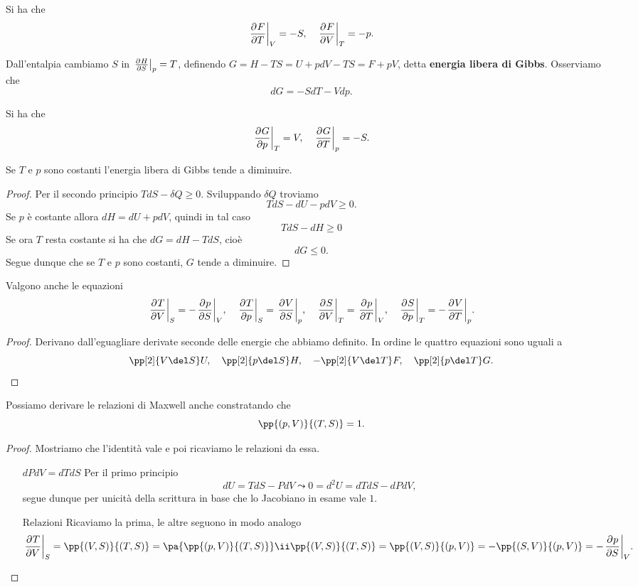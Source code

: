 \begin{remark}
Si ha che
\[\ppb TFV=-S,\quad \ppb VFT=-p.\]
\end{remark}

\begin{definition}
Dall'entalpia cambiamo $S$ in $\ppb SHp=T$, definendo $G=H-TS=U+pdV-TS=F+pV$, detta \textbf{energia libera di Gibbs}. Osserviamo che
\[dG=-SdT-Vdp.\]
\end{definition}

\begin{remark}
Si ha che
\[\ppb pGT=V,\quad \ppb TGp=-S.\]
\end{remark}

\begin{proposition}\label{GibbsDiminuiscePerPressioneETemperaturaCostanti}
Se $T$ e $p$ sono costanti l'energia libera di Gibbs tende a diminuire.
\end{proposition}
\begin{proof}
Per il secondo principio $TdS-\delta Q\geq 0$. Sviluppando $\delta Q$ troviamo
\[TdS-dU-pdV\geq0.\]
Se $p$ \`e costante allora $dH=dU+pdV$, quindi in tal caso
\[TdS-dH\geq 0\]
Se ora $T$ resta costante si ha che $dG=dH-TdS$, cio\`e
\[dG\leq 0.\]
Segue dunque che se $T$ e $p$ sono costanti, $G$ tende a diminuire.
\end{proof}


\begin{proposition}\label{RelazioniMaxwell}
Valgono anche le equazioni
\[\ppb VTS=-\ppb SpV,\quad \ppb pTS=\ppb SVp,\quad \ppb VST=\ppb TpV,\quad \ppb pST=-\ppb TVp.\]
\end{proposition}
\begin{proof}
Derivano dall'eguagliare derivate seconde delle energie che abbiamo definito. In ordine le quattro equazioni sono uguali a
\[\pp[2]{V\del S}U,\quad \pp[2]{p\del S}H,\quad -\pp[2]{V\del T}F,\quad \pp[2]{p\del T}G.\]
\end{proof}

\begin{remark}[Jacobiano $p,V$ - $T,S$]
Possiamo derivare le relazioni di Maxwell anche constratando che
\[\pp{(p,V)}{(T,S)}=1.\]
\end{remark}
\begin{proof}
Mostriamo che l'identit\`a vale e poi ricaviamo le relazioni da essa.
\setlength{\leftmargini}{0cm}
\begin{itemize}
\item[$\boxed{dPdV=dTdS}$] Per il primo principio
\[dU=TdS-PdV\leadsto 0=d^2U=dTdS-dPdV,\]
segue dunque per unicit\`a della scrittura in base che lo Jacobiano in esame vale $1$.
\item[$\boxed{\text{Relazioni}}$] Ricaviamo la prima, le altre seguono in modo analogo
\[\ppb VTS=\pp{(V,S)}{(T,S)}=\pa{\pp{(p,V)}{(T,S)}}\ii\pp{(V,S)}{(T,S)}=\pp{(V,S)}{(p,V)}=-\pp{(S,V)}{(p,V)}=-\ppb SpV.\]
\end{itemize}
\setlength{\leftmargini}{0.5cm}
\end{proof}





